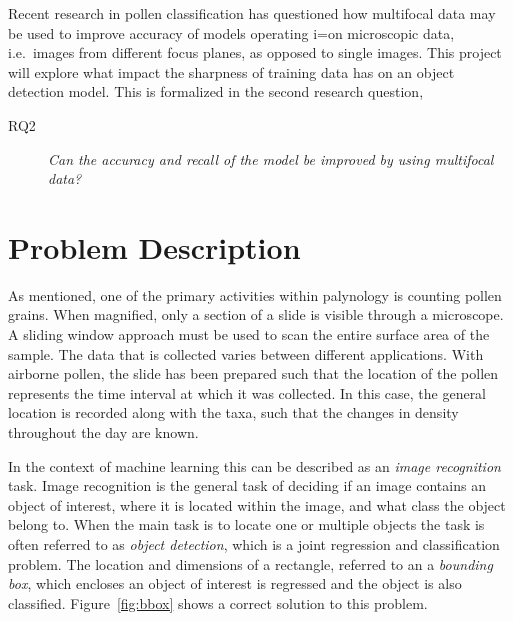 Recent research in pollen classification has questioned how multifocal data may be used to improve accuracy of models operating i=on microscopic data, i.e.\ images from different focus planes, as opposed to single images.
This project will explore what impact the sharpness of training data has on an object detection model.
This is formalized in the second research question,

\begin{description}
    \item[RQ2] \textit{Can the accuracy and recall of the model be improved by using multifocal data?}
\end{description}

\section{Problem Description}\label{sec:back-problem}



As mentioned, one of the primary activities within palynology is counting pollen grains.
When magnified, only a section of a slide is visible through a microscope.
A sliding window approach must be used to scan the entire surface area of the sample.
The data that is collected varies between different applications.
With airborne pollen, the slide has been prepared such that the location of the pollen represents the time interval at which it was collected.
In this case, the general location is recorded along with the taxa, such that the changes in density throughout the day are known.

In the context of machine learning this can be described as an \textit{image recognition} task.
Image recognition is the general task of deciding if an image contains an object of interest, where it is located within the image, and what class the object belong to.
When the main task is to locate one or multiple objects the task is often referred to as \textit{object detection}, which is a joint regression and classification problem.
The location and dimensions of a rectangle, referred to an a \textit{bounding box}, which encloses an object of interest is regressed and the object is also classified.
Figure~\ref{fig:bbox} shows a correct solution to this problem.


